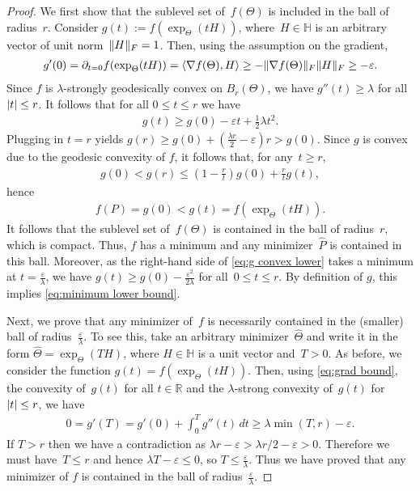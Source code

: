 \documentclass[aos]{imsart}
\theoremstyle{definition}
\numberwithin{equation}{section}
\DeclarePairedDelimiter{\abs}{\lvert}{\rvert}
\DeclarePairedDelimiter{\norm}{\lVert}{\rVert}
\newcommand{\R}{{\mathbb{R}}}
\renewcommand{\H}{{\mathbb{H}}}
\newcommand{\htheta}{\widehat{\Theta}}
\newcommand{\eps}{\varepsilon}
\begin{document}
\begin{proof}
We first show that the sublevel set of~$f(\Theta)$ is included in the ball of radius~$r$.
Consider $g(t) := f(\exp_\Theta(tH))$, where~$H\in\H$ is an arbitrary vector of unit norm~$\norm H_F = 1$.
Then, using the assumption on the gradient,
\begin{align}\label{eq:grad bound}
  g'(0)
= \partial_{t=0} f(\exp_\Theta(tH))
= \braket{\nabla f(\Theta), H}
\geq -\norm{\nabla f(\Theta)}_F \norm H_F
\geq -\eps.
\end{align}
Since $f$ is $\lambda$-strongly geodesically convex on $B_r(\Theta)$, we have $g''(t) \geq \lambda$ for all $\abs t\leq r$.
It follows that for all $0 \leq t \leq  r$ we have
\begin{align}\label{eq:g convex lower}
  g(t) \geq g(0) - \eps t + \frac12 \lambda t^2.
\end{align}
Plugging in $t = r$ yields
$g(r) \geq  %
g(0) + \left( \frac{\lambda r}2 - \eps \right)  r
> g(0)$.
Since $g$ is convex due to the geodesic convexity of $f$, it follows that, for any~$t \geq  r$,
\begin{align*}
  g(0) < g( r) \leq \left( 1-\frac{ r}t \right) g(0) + \frac{ r}t g(t),
\end{align*}
hence
\begin{align*}
  f(P) = g(0) < g(t) = f(\exp_\Theta(tH)).
\end{align*}
It follows that the sublevel set of~$f(\Theta)$ is contained in the ball of radius~$r$, which is compact.
Thus, $f$ has a minimum and any minimizer~$\hat P$ is contained in this ball.
Moreover, as the right-hand side of \cref{eq:g convex lower} takes a minimum at $t=\frac\eps\lambda$, we have $g(t) \geq g(0) - \frac{\eps^2}{2\lambda}$ for all~$0\leq t\leq r$.
By definition of $g$, this implies \cref{eq:minimum lower bound}.

Next, we prove that any minimizer of~$f$ is necessarily contained in the (smaller) ball of radius~$\frac\eps\lambda$.
To see this, take an arbitrary minimizer~$\htheta$ and write it in the form $\htheta = \exp_\Theta(TH)$, where $H\in \H$ is a unit vector and~$T>0$.
As before, we consider the function $g(t) = f(\exp_\Theta(tH))$.
Then, using \cref{eq:grad bound}, the convexity of~$g(t)$ for all $t\in\R$ and the $\lambda$-strong convexity of~$g(t)$ for $\abs t \leq  r$, we have
\begin{align*}
  0 = g'(T) = g'(0) + \int_0^T g''(t) \, dt \geq \lambda \min(T,  r) - \eps.
\end{align*}
If $T> r$ then we have a contradiction as $\lambda r - \eps > \lambda r/2 - \eps > 0$.
Therefore we must have~$T\leq r$ and hence $\lambda T - \eps \leq 0$, so $T \leq \frac\eps\lambda$.
Thus we have proved that any minimizer of $f$ is contained in the ball of radius~$\frac\eps\lambda$.


\end{proof}
\end{document}
